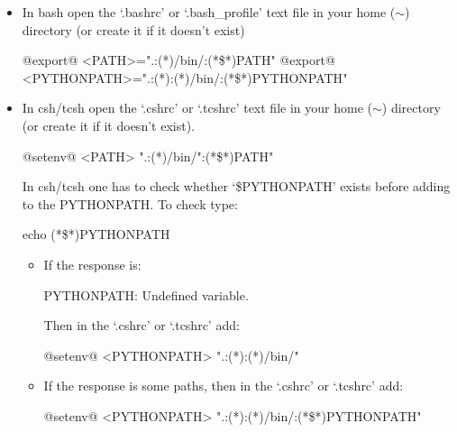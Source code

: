 \begin{itemize}
	\item In bash open the `.bashrc' or `.bash\_profile' text file in your home ($\sim$) directory (or create it if it doesn't exist)

	\begin{bashbox}[title={e.g. in $\sim$/.bashrc or $\sim$/.bash\_profile}]
	@export@ <PATH>=".:(*\InstallDIR*)/bin/:{(*\$*)PATH}"
	@export@ <PYTHONPATH>=".:(*\InstallDIR*):(*\InstallDIR*)/bin/:{(*\$*)PYTHONPATH}"
	\end{bashbox}

	\item In csh/tcsh open the `.cshrc' or `.tcshrc' text file in your home ($\sim$) directory (or create it if it doesn't exist).

	\begin{cshbox}[title={e.g. in $\sim$/.tcshrc}]
	@setenv@ <PATH> ".:(*\InstallDIR*)/bin/":{(*\$*){PATH}}"
	\end{cshbox}

	In csh/tcsh one has to check whether `\$PYTHONPATH' exists before adding to the PYTHONPATH. To check type:

	\begin{cmdbox}
	echo (*\$*)PYTHONPATH
	\end{cmdbox}

	\begin{itemize}
	\item \begin{thighlight}
		If the response is:
		\begin{cmdboxprint}
		PYTHONPATH: Undefined variable.
		\end{cmdboxprint}

		Then in the `.cshrc' or `.tcshrc' add: 

		\begin{cshbox}[title={e.g. in $\sim$/.tcshrc}]
		@setenv@ <PYTHONPATH> ".:(*\InstallDIR*):(*\InstallDIR*)/bin/"
		\end{cshbox}
		\end{thighlight}

	\item \begin{thighlight}
		If the response is some paths, then in the `.cshrc' or `.tcshrc' add: 

		\begin{cshbox}[title={e.g. in $\sim$/.tcshrc}]
		@setenv@ <PYTHONPATH> ".:(*\InstallDIR*):(*\InstallDIR*)/bin/:(*\$*){PYTHONPATH}"
		\end{cshbox}
		\end{thighlight}

	\end{itemize}

\end{itemize}

